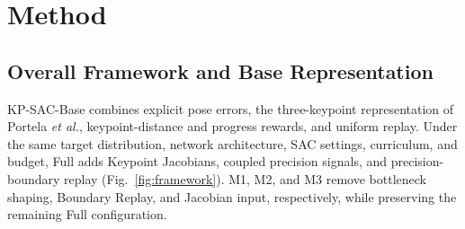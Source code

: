 \documentclass[conference]{IEEEtran}
\begin{document}
\section{Method}
\subsection{Overall Framework and Base Representation}
KP-SAC-Base combines explicit pose errors, the three-keypoint representation of Portela \emph{et al.}, keypoint-distance and progress rewards, and uniform replay. Under the same target distribution, network architecture, SAC settings, curriculum, and budget, Full adds Keypoint Jacobians, coupled precision signals, and precision-boundary replay (Fig.~\ref{fig:framework}). M1, M2, and M3 remove bottleneck shaping, Boundary Replay, and Jacobian input, respectively, while preserving the remaining Full configuration.
\end{document}
